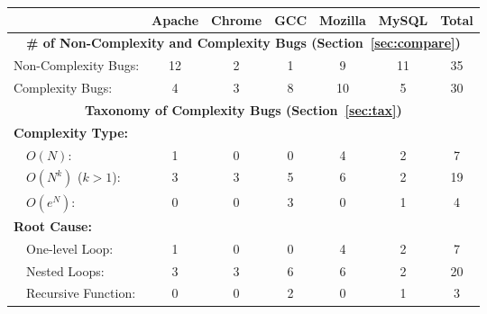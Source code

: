 
\begin{table}[tb!]
\begin{adjustwidth}{-.5in}{-.5in}
\centering
{
\scriptsize{
\begin{tabular}{|lcccccc|}
\hline
                                                                                  	&   Apache  &   Chrome   &  GCC   &    Mozilla   &   MySQL  &  Total\\
\hline
\multicolumn{7}{|c|}{\bf \# of Non-Complexity and Complexity Bugs (Section~\ref{sec:compare})}\\
\multicolumn{1}{|l}{Non-Complexity Bugs:}                                                   &   12      &    2       &   1    &    9         &  11      &   35 \\
\multicolumn{1}{|l}{Complexity Bugs:}                                                       &   4       &    3       &   8    &    10        &   5      &   30 \\
\hline \hline
\multicolumn{7}{|c|}{\bf Taxonomy of Complexity Bugs (Section~\ref{sec:tax})}\\
\hline
\multicolumn{7}{|l|}{\bf Complexity Type:} \\
\ \	{$O(N)$:}                              					&   1       &    0       &   0    &    4         &   2      &   7\\
\ \ {$O(N^k)$ ($k>1$):}                						&   3       &    3       &   5    &    6         &   2      &  19\\
\ \ {$O(e^N)$:}                       							&   0       &    0       &   3    &    0         &   1      &   4\\
\hline
\multicolumn{7}{|l|}{\bf Root Cause:} \\
\ \ {{One-level Loop:}}                 			&   1       &    0       &   0    &    4         &   2      &   7 \\
\ \ {{Nested Loops:}}                   			&   3       &    3       &   6    &    6         &   2      &   20 \\
\ \ {{Recursive Function:}}             			&   0       &    0       &   2    &    0         &   1      &   3 \\
\hline


\end{tabular}}}
\end{adjustwidth}
\end{table}
